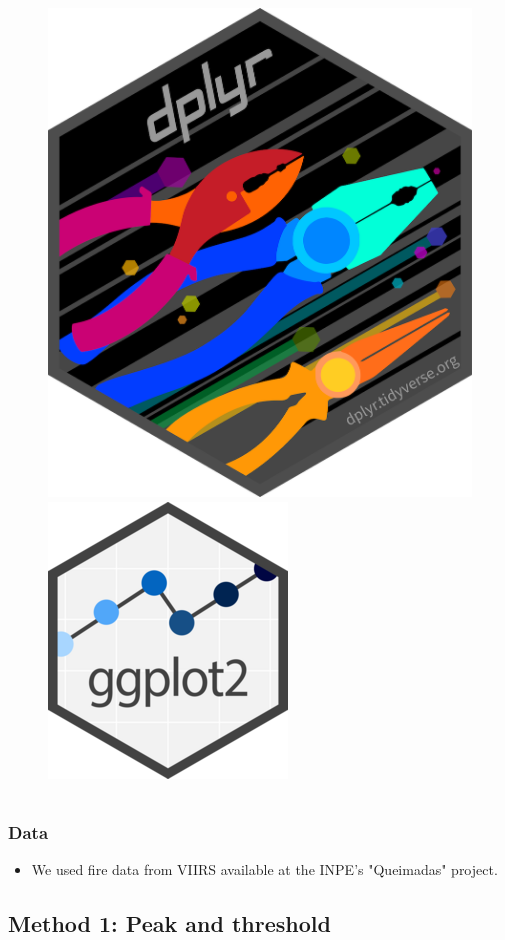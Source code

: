 \documentclass[aspectratio=169]{beamer}
\begin{document}
\begin{frame}
\begin{columns}
\begin{column}{0.5\linewidth}
\begin{figure}[h]
                \includegraphics[width=0.24\linewidth]{./logos/dplyr.png}
                \includegraphics[width=0.24\linewidth]{./logos/ggplot2_logo.png}
            \end{figure}
        \end{column}
    \end{columns}
\end{frame}

\begin{frame}
    \frametitle{Data}
    \begin{itemize}
        \item We used fire data from VIIRS available at the INPE's "Queimadas"
            project.
    \end{itemize}
\end{frame}

\subsection{Method 1: Peak and threshold}
\end{document}
